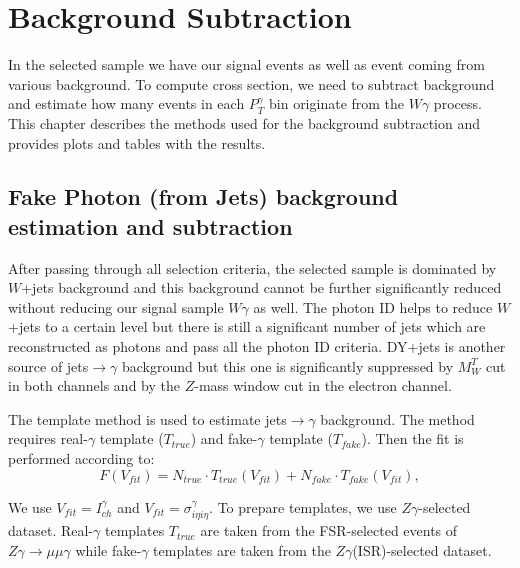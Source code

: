 \section{Background Subtraction}
\label{sec:BackgroundSubtraction}

In the selected sample we have our signal events as well as event coming from various background. To compute cross section, we need to subtract background and estimate how many events in each $P_T^\gamma$ bin originate from the $W\gamma$ process. This chapter describes the methods used for the background subtraction and provides plots and tables with the results.

\subsection{Fake Photon (from Jets) background estimation and subtraction}
\label{sec:BackgroundSubtraction_jtog}

After passing through all selection criteria, the selected sample is dominated by $W$+jets background and this background cannot be further significantly reduced without reducing our signal sample $W\gamma$ as well. The photon ID helps to reduce $W$+jets to a certain level but there is still a significant number of jets which are reconstructed as photons and pass all the photon ID criteria. DY+jets is another source of jets$\rightarrow \gamma$ background but this one is significantly suppressed by $M_W^T$ cut in both channels and by the $Z$-mass window cut in the electron channel.

The template method is used to estimate jets$ \rightarrow \gamma$ background. The method requires real-$\gamma$ template ($T_{true}$) and fake-$\gamma$ template ($T_{fake}$). Then the fit is performed according to: 
\begin{equation}
F(V_{fit})=N_{true} \cdot T_{true}(V_{fit}) + N_{fake} \cdot T_{fake}(V_{fit}),
\end{equation}

We use $V_{fit}=I_{ch}^{\gamma}$ and $V_{fit}=\sigma_{i\eta i\eta}^{\gamma}$. To prepare templates, we use $Z\gamma$-selected dataset. Real-$\gamma$ templates $T_{true}$ are taken from the FSR-selected events of $Z\gamma\rightarrow\mu\mu\gamma$ while fake-$\gamma$ templates are taken from the $Z\gamma$(ISR)-selected dataset.

